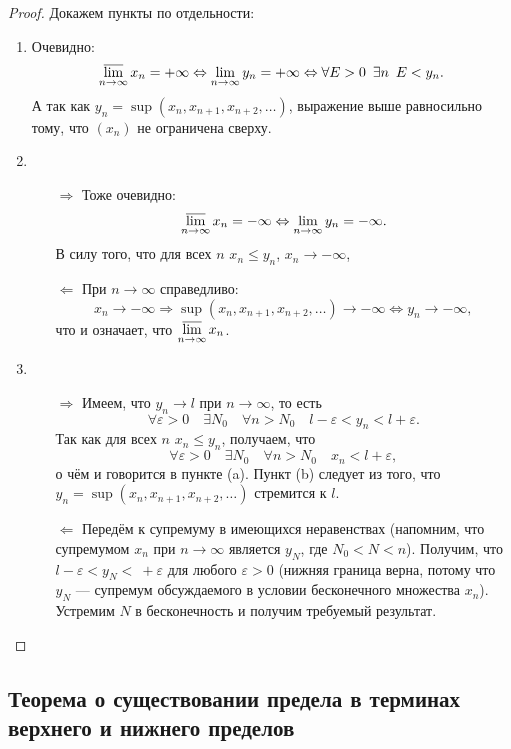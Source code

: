 \begin{proof}
	Докажем пункты по отдельности:
	\begin{enumerate}
		\item Очевидно: \[
			\varlimsup_{n \to \infty} x_n = +\infty \Leftrightarrow \lim_{n \to \infty} y_n = +\infty \Leftrightarrow \forall E > 0 \enskip \exists n \enskip E < y_n.
		\]
		А так как \(y_n = \sup(x_n, x_{n + 1}, x_{n + 2}, \ldots)\), выражение выше равносильно тому, что \((x_n)\) не ограничена сверху.
		\item 
		\begin{enumerate}
			\item[\(\Rightarrow\)] Тоже очевидно: \[
			\varlimsup\limits_{n \to \infty} x_n = -\infty \Leftrightarrow \lim_{n \to \infty} y_n = -\infty.
			\]
			В силу того, что для всех \(n\) \(x_n \leqslant y_n\), \(x_n \to -\infty\),
			\item[\(\Leftarrow\)] При \(n \to \infty\) справедливо: \[
				x_n \to -\infty \Rightarrow \sup(x_n, x_{n + 1}, x_{n + 2}, \ldots) \to -\infty \Leftrightarrow y_n \to -\infty,
			\]
			что и означает, что \(\varlimsup\limits_{n \to \infty} x_n\).
		\end{enumerate}
		\item
		\begin{enumerate}
			\item[\(\Rightarrow\)] Имеем, что \(y_n \to l\) при \(n \to \infty\), то есть \[
				\forall \varepsilon > 0 \quad  \exists N_0 \quad \forall n > N_0 \quad l - \varepsilon < y_n < l + \varepsilon.
			\]
			Так как для всех \(n\) \(x_n \leqslant y_n\), получаем, что \[
				\forall \varepsilon > 0 \quad  \exists N_0 \quad \forall n > N_0 \quad x_n < l + \varepsilon,
			\]
			о чём и говорится в пункте (a). Пункт (b) следует из того, что \(y_n = \sup(x_n, x_{n + 1}, x_{n + 2}, \ldots)\) стремится к \(l\).
			\item[\(\Leftarrow\)] Передём к супремуму в имеющихся неравенствах (напомним, что супремумом \(x_n\) при \(n \to \infty\) является \(y_N\), где \(N_0 < N < n\)). Получим, что \(l - \varepsilon < y_N < \ + \varepsilon\) для любого \(\varepsilon > 0\) (нижняя граница верна, потому что \(y_N\) --- супремум обсуждаемого в условии бесконечного множества \(x_n\)). Устремим \(N\) в бесконечность и получим требуемый результат.
		\end{enumerate}
	\end{enumerate}
\end{proof}

\subsection{Теорема о существовании предела в терминах верхнего и нижнего пределов}

